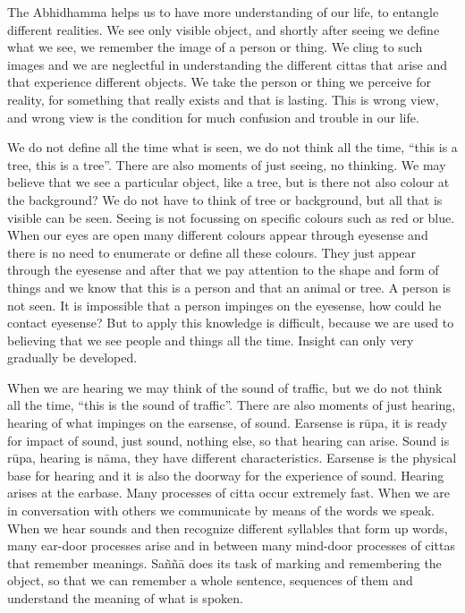 The Abhidhamma helps us to have more understanding of our life, to entangle different realities. We see only visible object, and shortly after seeing we define what we see, we remember the image of a person or thing. We cling to such images and we are neglectful in understanding the different cittas that arise and that experience different objects. We take the person or thing we perceive for reality, for something that really exists and that is lasting. This is wrong view, and wrong view is the condition for much confusion and trouble in our life.

We do not define all the time what is seen, we do not think all the time, ``this is a tree, this is a tree''. There are also moments of just seeing, no thinking. We may believe that we see a particular object, like a tree, but is there not also colour at the background? We do not have to think of tree or background, but all that is visible can be seen. Seeing is not focussing on specific colours such as red or blue. When our eyes are open many different colours appear through eyesense and there is no need to enumerate or define all these colours. They just appear through the eyesense and after that we pay attention to the shape and form of things and we know that this is a person and that an animal or tree. A person is not seen. It is impossible that a person impinges on the eyesense, how could he contact eyesense? But to apply this knowledge is difficult, because we are used to believing that we see people and things all the time. Insight can only very gradually be developed.

When we are hearing we may think of the sound of traffic, but we do not think all the time, ``this is the sound of traffic''. There are also moments of just hearing, hearing of what impinges on the earsense, of sound. Earsense is rūpa, it is ready for impact of sound, just sound, nothing else, so that hearing can arise. Sound is rūpa, hearing is nāma, they have different characteristics. Earsense is the physical base for hearing and it is also the doorway for the experience of sound. Hearing arises at the earbase. Many processes of citta occur extremely fast. When we are in conversation with others we communicate by means of the words we speak. When we hear sounds and then recognize different syllables that form up words, many ear-door processes arise and in between many mind-door processes of cittas that remember meanings. Saññā does its task of marking and remembering the object, so that we can remember a whole sentence, sequences of them and understand the meaning of what is spoken.

